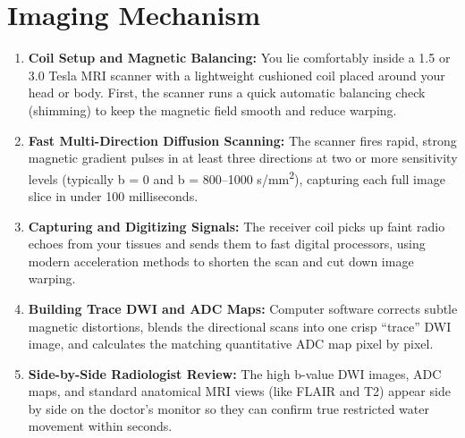 \section{Imaging Mechanism}
\begin{enumerate}
\item \textbf{Coil Setup and Magnetic Balancing:} You lie comfortably inside a 1.5 or 3.0 Tesla MRI scanner with a lightweight cushioned coil placed around your head or body. First, the scanner runs a quick automatic balancing check (shimming) to keep the magnetic field smooth and reduce warping.
\item \textbf{Fast Multi-Direction Diffusion Scanning:} The scanner fires rapid, strong magnetic gradient pulses in at least three directions at two or more sensitivity levels (typically b = 0 and b = 800--1000 s/mm\textsuperscript{2}), capturing each full image slice in under 100 milliseconds.
\item \textbf{Capturing and Digitizing Signals:} The receiver coil picks up faint radio echoes from your tissues and sends them to fast digital processors, using modern acceleration methods to shorten the scan and cut down image warping.
\item \textbf{Building Trace DWI and ADC Maps:} Computer software corrects subtle magnetic distortions, blends the directional scans into one crisp ``trace'' DWI image, and calculates the matching quantitative ADC map pixel by pixel.
\item \textbf{Side-by-Side Radiologist Review:} The high b-value DWI images, ADC maps, and standard anatomical MRI views (like FLAIR and T2) appear side by side on the doctor's monitor so they can confirm true restricted water movement within seconds.
\end{enumerate}

